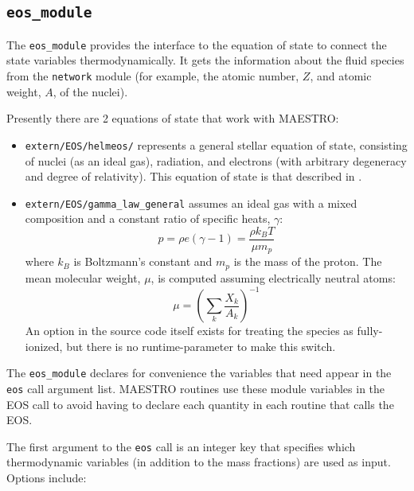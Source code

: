 \subsection{{\tt eos\_module}}

The {\tt eos\_module} provides the interface to the equation of 
state to connect the state variables thermodynamically.  It 
gets the information about the fluid species from the {\tt network}
module (for example, the atomic number, $Z$, and atomic weight, $A$,
of the nuclei).

Presently there are 2 equations of state that work with MAESTRO:
\begin{itemize}
\item {\tt extern/EOS/helmeos/} represents a general stellar equation 
      of state, consisting of nuclei (as an ideal gas), radiation,
      and electrons (with arbitrary degeneracy and degree of relativity).
      This equation of state is that described in \cite{timmes_eos}.

\item {\tt extern/EOS/gamma\_law\_general} assumes an ideal gas with a mixed 
     composition and a constant ratio of specific heats, $\gamma$:
      \begin{equation}
      p = \rho e (\gamma - 1) = \frac{\rho k_B T}{\mu m_p} 
      \end{equation}
     where $k_B$ is Boltzmann's constant and $m_p$ is the mass of the
     proton.
     The mean molecular weight, $\mu$, is computed assuming 
     electrically neutral atoms:
     \begin{equation}
     \mu = \left ( \sum_k \frac{X_k}{A_k} \right )^{-1}
     \end{equation}
     An option in the source code itself exists for treating the
     species as fully-ionized, but there is no runtime-parameter to
     make this switch.
\end{itemize}

The {\tt eos\_module} declares for convenience the variables that need
appear in the {\tt eos} call argument list.  MAESTRO routines use
these module variables in the EOS call to avoid having to declare 
each quantity in each routine that calls the EOS.

The first argument to the {\tt eos} call is an integer key that
specifies which thermodynamic variables (in addition to the mass
fractions) are used as input.  Options include:

